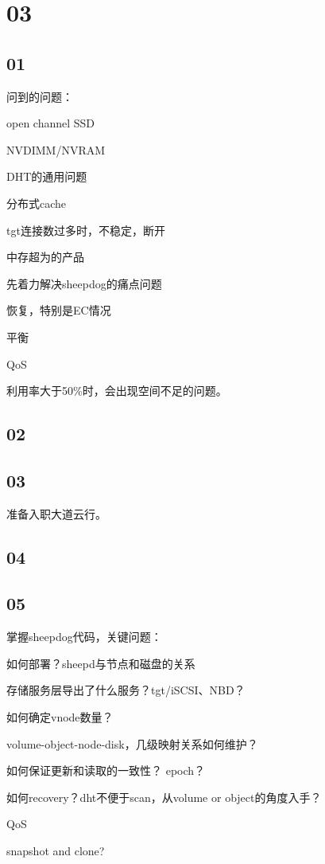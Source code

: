 \section{03}

\subsection{01}

问到的问题：
\begin{enumbox}
\item open channel SSD
\item NVDIMM/NVRAM
\item DHT的通用问题
\item 分布式cache
\item tgt连接数过多时，不稳定，断开
\item 中存超为的产品
\end{enumbox}

先着力解决sheepdog的痛点问题
\begin{enumbox}
\item 恢复，特别是EC情况
\item 平衡
\item QoS
\end{enumbox}

利用率大于50\%时，会出现空间不足的问题。

\subsection{02}

\subsection{03}

准备入职大道云行。

\subsection{04}

\subsection{05}

掌握sheepdog代码，关键问题：
\begin{enumbox}
\item 如何部署？sheepd与节点和磁盘的关系
\item 存储服务层导出了什么服务？tgt/iSCSI、NBD？
\item 如何确定vnode数量？
\item volume-object-node-disk，几级映射关系如何维护？
\item 如何保证更新和读取的一致性？ epoch？
\item 如何recovery？dht不便于scan，从volume or object的角度入手？
\item QoS
\item snapshot and clone?
\end{enumbox}

